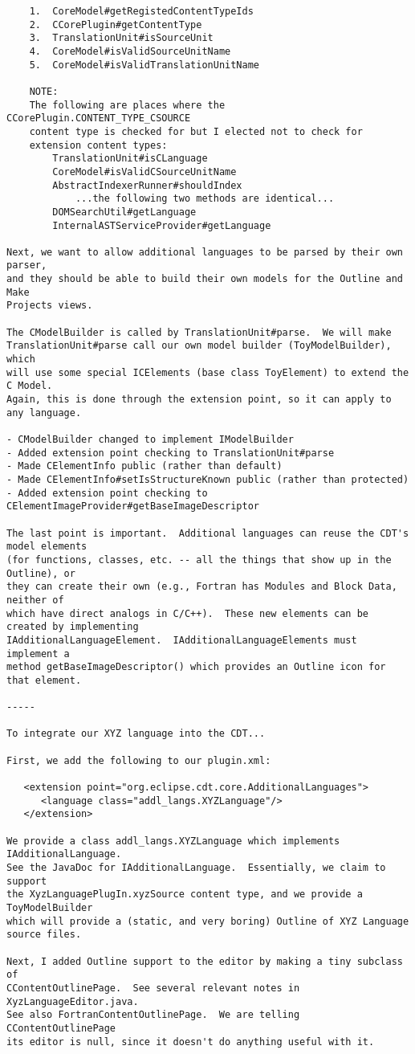 \begin{verbatim}
	1.	CoreModel#getRegistedContentTypeIds
	2.	CCorePlugin#getContentType
	3.	TranslationUnit#isSourceUnit
	4.	CoreModel#isValidSourceUnitName
	5.	CoreModel#isValidTranslationUnitName

	NOTE:
	The following are places where the CCorePlugin.CONTENT_TYPE_CSOURCE
	content type is checked for but I elected not to check for
	extension content types:
		TranslationUnit#isCLanguage
		CoreModel#isValidCSourceUnitName
		AbstractIndexerRunner#shouldIndex
			...the following two methods are identical...
		DOMSearchUtil#getLanguage
		InternalASTServiceProvider#getLanguage

Next, we want to allow additional languages to be parsed by their own parser,
and they should be able to build their own models for the Outline and Make
Projects views.

The CModelBuilder is called by TranslationUnit#parse.  We will make
TranslationUnit#parse call our own model builder (ToyModelBuilder), which
will use some special ICElements (base class ToyElement) to extend the C Model.
Again, this is done through the extension point, so it can apply to any language.

- CModelBuilder changed to implement IModelBuilder
- Added extension point checking to TranslationUnit#parse
- Made CElementInfo public (rather than default)
- Made CElementInfo#setIsStructureKnown public (rather than protected)
- Added extension point checking to CElementImageProvider#getBaseImageDescriptor

The last point is important.  Additional languages can reuse the CDT's model elements
(for functions, classes, etc. -- all the things that show up in the Outline), or
they can create their own (e.g., Fortran has Modules and Block Data, neither of
which have direct analogs in C/C++).  These new elements can be created by implementing
IAdditionalLanguageElement.  IAdditionalLanguageElements must implement a
method getBaseImageDescriptor() which provides an Outline icon for that element.

-----

To integrate our XYZ language into the CDT...

First, we add the following to our plugin.xml:

   <extension point="org.eclipse.cdt.core.AdditionalLanguages">
      <language class="addl_langs.XYZLanguage"/>
   </extension>

We provide a class addl_langs.XYZLanguage which implements IAdditionalLanguage.
See the JavaDoc for IAdditionalLanguage.  Essentially, we claim to support
the XyzLanguagePlugIn.xyzSource content type, and we provide a ToyModelBuilder
which will provide a (static, and very boring) Outline of XYZ Language source files.

Next, I added Outline support to the editor by making a tiny subclass of
CContentOutlinePage.  See several relevant notes in XyzLanguageEditor.java.
See also FortranContentOutlinePage.  We are telling CContentOutlinePage
its editor is null, since it doesn't do anything useful with it.
\end{verbatim}
